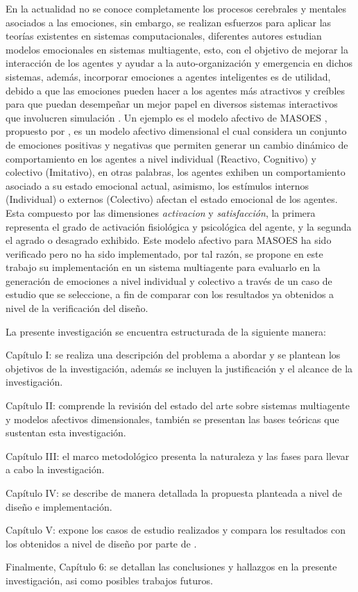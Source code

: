 En la actualidad no se conoce completamente los procesos cerebrales y mentales
asociados a las emociones, sin embargo, se realizan esfuerzos para aplicar las
teorías existentes en sistemas computacionales, diferentes autores estudian
modelos emocionales en sistemas multiagente, esto, con el objetivo de mejorar la
interacción de los agentes y ayudar a la auto-organización y emergencia en
dichos sistemas, además, incorporar emociones a agentes inteligentes
es de utilidad, debido a que las
emociones pueden hacer a los agentes más atractivos y creíbles para que puedan
desempeñar un mejor papel en diversos sistemas interactivos que involucren
simulación \citep{jiang2007}.
Un ejemplo es el modelo afectivo de MASOES , propuesto por
\cite{perozo2011}, es un modelo afectivo dimensional el cual considera un conjunto de emociones positivas y
negativas que permiten generar un cambio dinámico de comportamiento en los
agentes a nivel individual (Reactivo, Cognitivo) y colectivo (Imitativo), en
otras palabras, los agentes exhiben un comportamiento asociado a su estado
emocional actual, asimismo, los estímulos internos (Individual) o externos
(Colectivo) afectan el estado emocional de los agentes.
Esta compuesto por las dimensiones \textit{activacion} y \textit{satisfacción},
la primera representa el grado de activación fisiológica y psicológica del agente,
y la segunda el agrado o desagrado exhibido. Este modelo afectivo
para MASOES ha sido verificado \citep{perozo2011} pero no ha sido implementado,
por tal razón, se propone en este trabajo su implementación en un sistema
multiagente para evaluarlo en la generación de emociones a nivel individual y
colectivo a través de un caso de estudio que se seleccione, a fin de comparar
con los resultados ya obtenidos a nivel de la verificación del diseño.

La presente investigación se encuentra estructurada de la siguiente manera:

Capítulo I: se realiza una descripción del problema a abordar
y se plantean los objetivos de la investigación, además se incluyen la
justificación y el alcance de la investigación.

Capítulo II: comprende la revisión del estado del arte
sobre sistemas multiagente y modelos afectivos dimensionales, también se presentan las bases
teóricas que sustentan esta investigación.

Capítulo III: el marco metodológico presenta la naturaleza y las fases para llevar a cabo la
investigación.

Capítulo IV: se describe de manera detallada la propuesta planteada a nivel
de diseño e implementación.

Capítulo V: expone los casos de estudio realizados y compara los resultados con los obtenidos a nivel de diseño
por parte de \cite{perozo2011}.

Finalmente, Capítulo 6: se detallan las conclusiones y hallazgos en la presente investigación, asi
como posibles trabajos futuros.
